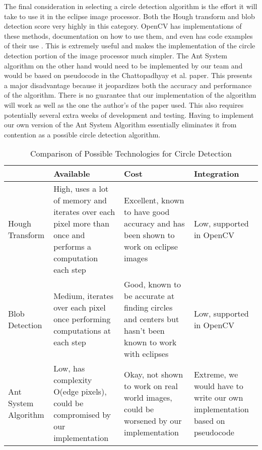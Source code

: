 \documentclass[10pt, onecolumn, draftclsnofoot, letterpaper, compsoc]{IEEEtran}
\begin{document}
The final consideration in selecting a circle detection algorithm is the effort
it will take to use it in the eclipse image processor. Both the Hough transform
and blob detection score very highly in this category. OpenCV has
implementations of these methods, documentation on how to use them, and even has
code examples of their use \cite{houghocv, blobarticle}. This is extremely useful
and makes the implementation of the circle detection portion of the image
processor much simpler. The Ant System algorithm on the other hand would need to
be implemented by our team and would be based on pseudocode in the Chattopadhyay
et al. paper. This presents a major disadvantage because it jeopardizes both the
accuracy and performance of the algorithm. There is no guarantee that our
implementation of the algorithm will work as well as the one the author’s of the
paper used. This also requires potentially several extra weeks of development
and testing. Having to implement our own version of the Ant System Algorithm
essentially eliminates it from contention as a possible circle detection
algorithm. \\

\begin{table}[h]
\centering
\caption{Comparison of Possible Technologies for Circle Detection}
\begin{tabular}{|p{3.15cm}|p{3.15cm}|p{3.15cm}|p{3.15cm}|}
\cline{4-4}

\hline  & Available & Cost & Integration \\ \hline

Hough Transform & High, uses a lot of memory and iterates over each pixel more
than once and performs a computation each step & Excellent, known to have good
accuracy and has been shown to work on eclipse images & Low, supported in OpenCV
\\ \hline

Blob Detection & Medium, iterates over each pixel once performing computations
at each step & Good, known to be accurate at finding circles and centers but
hasn’t been known to work with eclipses & Low, supported in OpenCV \\ \hline


Ant System Algorithm & Low, has complexity O(edge pixels), could be compromised
by our implementation & Okay, not shown to work on real world images, could be
worsened by our implementation & Extreme, we would have to write our own
implementation based on pseudocode \\ \hline

\end{tabular}
\label{table:george3}
\end{table}
\end{document}
